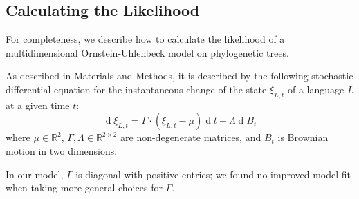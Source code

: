 \documentclass[11pt,a4paper]{article}
\begin{document}

\subsection{Calculating the Likelihood}
For completeness, we describe how to calculate the likelihood of a multidimensional Ornstein-Uhlenbeck model on phylogenetic trees.

As described in Materials and Methods, it is described by the following stochastic differential equation for the instantaneous change of the state $\xi_{L,t}$ of a language $L$ at a given time $t$:
\begin{equation*}
    \operatorname{d}\xi_{L,t} = \Gamma \cdot (\xi_{L,t}-\mu) \operatorname{d}t + \Lambda \operatorname{d}B_t
\end{equation*}
where $\mu \in \mathbb{R}^2$,  $\Gamma, \Lambda \in \mathbb{R}^{2\times 2}$ are non-degenerate matrices, and $B_t$ is Brownian motion in two dimensions.

In our model, $\Gamma$ is diagonal with positive entries; we found no improved model fit when taking more general choices for $\Gamma$.
\end{document}
